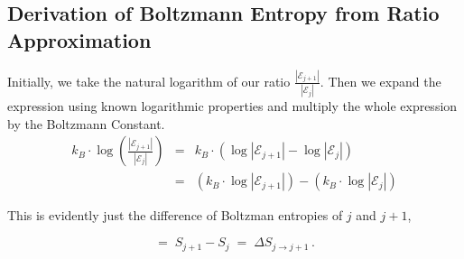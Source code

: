 \documentclass[journal=mamobx,manuscript=article]{achemso}
\begin{document}
\subsection{Derivation of Boltzmann Entropy from Ratio Approximation}

Initially, we take the natural logarithm of our ratio $\frac{|\mathcal{E}_{j+1}|}{|\mathcal{E}_{j}|}$. Then we  expand the expression using known logarithmic properties and multiply the whole expression by the Boltzmann Constant.
\begin{eqnarray*}
k_B\cdot \log\left(\frac{|\mathcal{E}_{j+1}|}{|\mathcal{E}_{j}|}\right)  & = & 
k_B\cdot\left(\log\left|\mathcal{E}_{j+1}\right|-\log\left|\mathcal{E}_{j}\right|\right)  \\
&= & \left(k_B\cdot \log\left|\mathcal{E}_{j+1}\right|\right)-\left(k_B\cdot \log\left|\mathcal{E}_{j}\right|\right)
\end{eqnarray*}

\noindent This is evidently just the difference of Boltzman entropies of $j$ and $j+1$,

$$ =\; S_{j+1}-S_{j}\;=\; \Delta S_{j\to j+1} \,.$$




%
\end{document}
